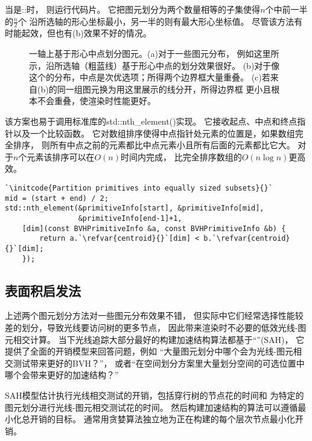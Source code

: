 当是{\ttfamily{}::}时，
则运行代码片。
它把图元划分为两个数量相等的子集使得$n$个中前一半的$\displaystyle\frac{n}{2}$个
沿所选轴的形心坐标最小，另一半的则有最大形心坐标值。
尽管该方法有时能起效，但也有(b)效果不好的情况。
\begin{figure}[htb]
    \centering
    \caption{一轴上基于形心中点划分图元。(a)对于一些图元分布，
        例如这里所示，沿所选轴（粗蓝线）基于形心中点的划分效果很好。
        (b)对于像这个的分布，中点是次优选项；所得两个边界框大量重叠。
        (c)若来自(b)的同一组图元换为用这里展示的线分开，所得边界框
        更小且根本不会重叠，使渲染时性能更好。}
    \label{fig:4.4}
\end{figure}

该方案也易于调用标准库的{\ttfamily std::nth\_element()}实现。
它接收起点、中点和终点指针以及一个比较函数。
它对数组排序使得中点指针处元素的位置是，如果数组完全排序，
则所有中点之前的元素都比中点元素小且所有后面的元素都比它大。
对于$n$个元素该排序可以在$O(n)$时间内完成，
比完全排序数组的$O(n\log{n})$更高效。
\begin{lstlisting}
`\initcode{Partition primitives into equally sized subsets}{}`
mid = (start + end) / 2;
std::nth_element(&primitiveInfo[start], &primitiveInfo[mid], 
                 &primitiveInfo[end-1]+1,
    [dim](const BVHPrimitiveInfo &a, const BVHPrimitiveInfo &b) { 
        return a.`\refvar{centroid}{}`[dim] < b.`\refvar{centroid}{}`[dim];
    });
\end{lstlisting}

\subsection{表面积启发法}\label{sub:表面积启发法}
上述两个图元划分方法对一些图元分布效果不错，
但实际中它们经常选择性能较差的划分，导致光线要访问树的更多节点，
因此带来渲染时不必要的低效光线-图元相交计算。
当下光线追踪大部分最好的构建加速结构算法都基于“”(SAH)，
它提供了全面的开销模型来回答问题，例如
“大量图元划分中哪个会为光线-图元相交测试带来更好的BVH？”，
或者“在空间划分方案里大量划分空间的可选位置中哪个会带来更好的加速结构？”

SAH模型估计执行光线相交测试的开销，包括穿行树的节点花的时间和
为特定的图元划分进行光线-图元相交测试花的时间。
然后构建加速结构的算法可以遵循最小化总开销的目标。
通常用贪婪算法独立地为正在构建的每个层次节点最小化开销。

